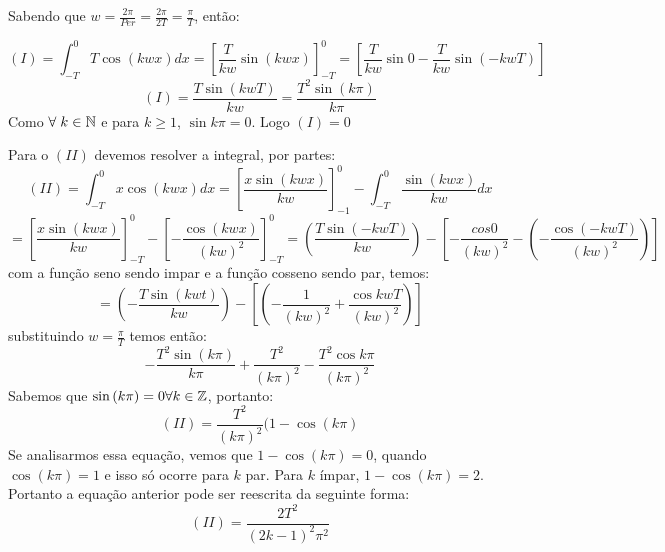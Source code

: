 Sabendo que $w = \frac{2\pi}{Per} = \frac{2\pi}{2T} = \frac{\pi}{T}$, então:

\begin{equation*}
    (I) = \int_{-T}^0 T\cos{(kwx)}dx = \left[\frac{T}{kw}\sin{(kwx)}\right]^0_{-T} = \left[\frac{T}{kw}\sin{0}- \frac{T}{kw}\sin{(-kwT)}\right]
\end{equation*}
\begin{equation}
    \label{eq:sf5cI}
    (I) = \frac{T\sin{(kwT)}}{kw} = \frac{T^2\sin{(k\pi)}}{k\pi}
\end{equation}
Como $\forall \hspace{1mm} k\in\mathbb{N}$ e para $k\geq1$, $\sin{k\pi} = 0$. Logo $(I) =0$

Para o $(II)$ devemos resolver a integral, por partes:
\begin{equation*}
    (II) = \int_{-T}^0 x\cos{(kwx)}dx = \left[\frac{x\sin{(kwx)}}{kw}\right]^0_{-1} - \int_{-T}^0\frac{\sin(kwx)}{kw}dx
\end{equation*}
\begin{equation*}
    = \left[\frac{x\sin{(kwx)}}{kw}\right]^0_{-T} - \left[-\frac{\cos{(kwx)}}{(kw)^2}\right]^0_{-T} = \left(\frac{T\sin{(-kwT)}}{kw}\right) - \left[-\frac{cos0}{(kw)^2} - \left(-\frac{\cos{(-kwT)}}{(kw)^2}\right)\right]
\end{equation*}
com a função seno sendo impar e a função cosseno sendo par, temos:
\begin{equation*}
    =\left(-\frac{T\sin{(kwt)}}{kw}\right)-\left[\left(-\frac{1}{(kw)^2} + \frac{\cos{kwT}}{(kw)^2}\right)\right]
\end{equation*}
substituindo $w = \frac{\pi}{T}$ temos então:
\begin{equation*}
    -\frac{T^2\sin{(k\pi)}}{k\pi} + \frac{T^2}{(k\pi)^2} - \frac{T^2\cos{k\pi}}{(k\pi)^2}
\end{equation*}
Sabemos que $\sin{(k\pi)} = 0 \forall k \in \mathbb{Z}$, portanto:
\begin{equation}
    \label{eq:sf5cIIns}
    (II) = \frac{T^2}{(k\pi)^2}(1 - \cos{(k\pi)}
\end{equation}
Se analisarmos essa equação, vemos que $1- \cos{(k\pi)} = 0$, quando $\cos{(k\pi)} = 1$ e isso só ocorre para $k$ par. Para $k$ ímpar, $1- \cos{(k\pi)} = 2$. Portanto a equação anterior pode ser reescrita da seguinte forma:
\begin{equation}
    \label{eq:sf5cIIs}
    (II) = \frac{2T^2}{(2k-1)^2\pi^2}
\end{equation}

